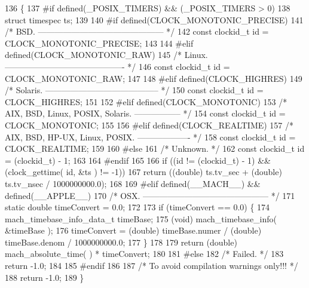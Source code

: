 \begin{DoxyCode}
136                               \{
137 \textcolor{preprocessor}{    #if defined(\_POSIX\_TIMERS) && (\_POSIX\_TIMERS > 0)}
138     \textcolor{keyword}{struct }timespec ts;
139 
140 \textcolor{preprocessor}{    #if defined(CLOCK\_MONOTONIC\_PRECISE)}
141     \textcolor{comment}{/* BSD. --------------------------------------------- */}
142     \textcolor{keyword}{const} clockid\_t \textcolor{keywordtype}{id} = CLOCK\_MONOTONIC\_PRECISE;
143 
144 \textcolor{preprocessor}{    #elif defined(CLOCK\_MONOTONIC\_RAW)}
145     \textcolor{comment}{/* Linux. ------------------------------------------- */}
146     \textcolor{keyword}{const} clockid\_t \textcolor{keywordtype}{id} = CLOCK\_MONOTONIC\_RAW;
147 
148 \textcolor{preprocessor}{    #elif defined(CLOCK\_HIGHRES)}
149     \textcolor{comment}{/* Solaris. ----------------------------------------- */}
150     \textcolor{keyword}{const} clockid\_t \textcolor{keywordtype}{id} = CLOCK\_HIGHRES;
151 
152 \textcolor{preprocessor}{    #elif defined(CLOCK\_MONOTONIC)}
153     \textcolor{comment}{/* AIX, BSD, Linux, POSIX, Solaris. ----------------- */}
154     \textcolor{keyword}{const} clockid\_t \textcolor{keywordtype}{id} = CLOCK\_MONOTONIC;
155 
156 \textcolor{preprocessor}{    #elif defined(CLOCK\_REALTIME)}
157     \textcolor{comment}{/* AIX, BSD, HP-UX, Linux, POSIX. ------------------- */}
158     \textcolor{keyword}{const} clockid\_t \textcolor{keywordtype}{id} = CLOCK\_REALTIME;
159 
160 \textcolor{preprocessor}{    #else}
161     \textcolor{comment}{/* Unknown. */}
162     \textcolor{keyword}{const} clockid\_t \textcolor{keywordtype}{id} = (clockid\_t) - 1;
163 
164 \textcolor{preprocessor}{    #endif}
165 
166     \textcolor{keywordflow}{if} ((\textcolor{keywordtype}{id} != (clockid\_t) - 1) && (clock\_gettime( \textcolor{keywordtype}{id}, &ts ) != -1))
167         \textcolor{keywordflow}{return} ((\textcolor{keywordtype}{double}) ts.tv\_sec + (double) ts.tv\_nsec / 1000000000.0);
168 
169 \textcolor{preprocessor}{    #elif defined(\_\_MACH\_\_) && defined(\_\_APPLE\_\_)}
170     \textcolor{comment}{/* OSX. --------------------------------------------- */}
171     \textcolor{keyword}{static} \textcolor{keywordtype}{double} timeConvert = 0.0;
172 
173     \textcolor{keywordflow}{if} (timeConvert == 0.0) \{
174         mach\_timebase\_info\_data\_t timeBase;
175         (void) mach\_timebase\_info( &timeBase );
176         timeConvert = (double) timeBase.numer / (\textcolor{keywordtype}{double}) timeBase.denom / 1000000000.0;
177     \}
178 
179     \textcolor{keywordflow}{return} (\textcolor{keywordtype}{double}) mach\_absolute\_time( ) * timeConvert;
180 
181 \textcolor{preprocessor}{    #else}
182     \textcolor{comment}{/* Failed. */}
183     \textcolor{keywordflow}{return} -1.0;
184 
185 \textcolor{preprocessor}{    #endif}
186 
187     \textcolor{comment}{/* To avoid compilation warnings only!!! */}
188     \textcolor{keywordflow}{return} -1.0;
189 \}
\end{DoxyCode}
